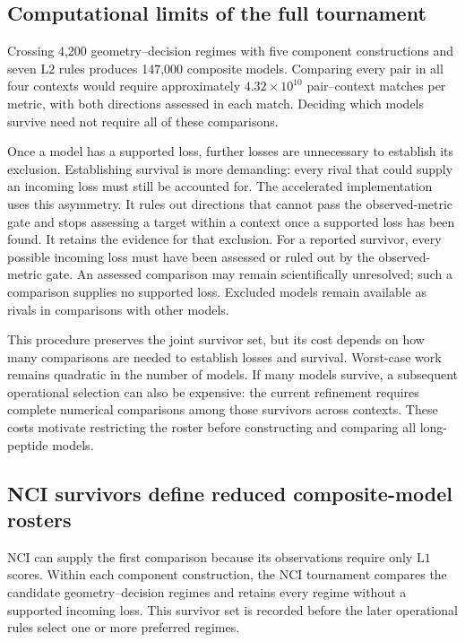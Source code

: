 \documentclass[11pt]{article}
\begin{document}
\subsection{Computational limits of the full tournament}

Crossing 4,200 geometry--decision regimes with five component constructions and
seven \(\mathrm{L2}\) rules produces 147,000 composite models. Comparing every
pair in all four contexts would require approximately
\(4.32\times10^{10}\) pair--context matches per metric, with both directions
assessed in each match. Deciding which models survive need not require all of
these comparisons.

Once a model has a supported loss, further losses are unnecessary to establish
its exclusion. Establishing survival is more demanding: every rival that could
supply an incoming loss must still be accounted for. The accelerated
implementation uses this asymmetry. It rules out directions that cannot pass
the observed-metric gate and stops assessing a target within a context once a
supported loss has been found. It retains the evidence for that exclusion.
For a reported survivor, every possible incoming loss must have been assessed
or ruled out by the observed-metric gate. An assessed comparison may remain
scientifically unresolved; such a comparison supplies no supported loss.
Excluded models remain available as rivals in comparisons with other models.

This procedure preserves the joint survivor set, but its cost depends on how
many comparisons are needed to establish losses and survival. Worst-case work
remains quadratic in the number of models. If many models survive, a subsequent
operational selection can also be expensive: the current refinement requires
complete numerical comparisons among those survivors across contexts. These
costs motivate restricting the roster before constructing and comparing all
long-peptide models.

\subsection{NCI survivors define reduced composite-model rosters}

NCI can supply the first comparison because its observations require only
\(\mathrm{L1}\) scores. Within each component construction, the NCI tournament
compares the candidate geometry--decision regimes and retains every regime
without a supported incoming loss. This survivor set is recorded before the
later operational rules select one or more preferred regimes.
\end{document}
